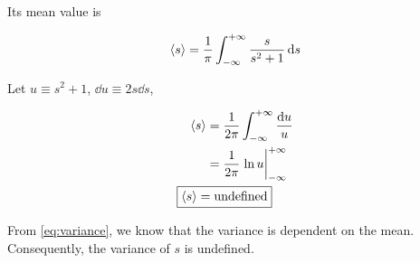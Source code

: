 \documentclass[12pt,a4paper,twocolumn]{article}
\begin{document}
\begin{enumerate}[(a)]
Its mean value is

\begin{equation}
	\ev{s} = \frac{1}{\pi} \int_{-\infty}^{+\infty} \frac{s}{s^2 +1} \dd{s}
\end{equation}

Let $u \equiv s^2 + 1$, $\dd{u} \equiv 2s\dd{s}$,

\begin{align}
	\ev{s} &= \frac{1}{2\pi} \int_{-\infty}^{+\infty} \frac{\dd{u}}{u} \nonumber \\
	&= \frac{1}{2\pi} \eval{\ln u}_{-\infty}^{+\infty} \nonumber \\
	\Aboxed{
		\ev{s} &= \mathrm{undefined}
	} \label{eq:answer-e-mean}
\end{align}

From \eqref{eq:variance}, we know that the variance is dependent on the mean. Consequently, the variance of $s$ is undefined.

\end{enumerate}
\end{document}
